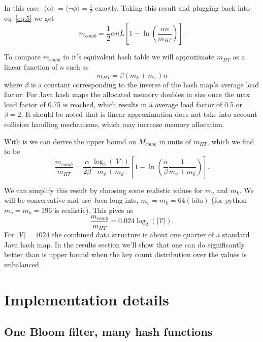 \documentclass[12pt]{article}
\DeclareMathOperator*{\ephi}{ \langle \phi \rangle}
\begin{document}
In this case $\ephi = \langle \lnot \phi \rangle = \frac{1}{2}$ exactly. Taking this result and plugging back into eq. \ref{eq:5} we get
\begin{equation} \label{eq:5}
m_{comb} = \frac{1}{2} \alpha n L \left[ 1 - \ln \left(\frac{\alpha n}{m_{HT}}\right) \right].
\end{equation} 

To compare $m_{comb}$ to it's equivalent hash table we will approximate $m_{HT}$ as a linear function of $n$ such as
\begin{equation}
m_{HT}= \beta (m_k + m_v)n 
\end{equation}
where $\beta$ is a constant corresponding to the inverse of the hash map's average load factor. For Java hash maps the allocated memory doubles in size once the max load factor of 0.75 is reached, which results in a average load factor of 0.5 or $\beta = 2$. It should be noted that is linear approximation does not take into account collision handling mechanisms, which may increase memory allocation. 

With is we can derive the upper bound on $M_{comb}$ in units of $m_{HT}$, which we find to be
\begin{equation}
\frac{m_{comb}}{m_{HT}}= \frac{\alpha}{2 \beta} \frac{\log_2(|\mathcal{V}|)}{m_v + m_k} \left[ 1 - \ln \left( \frac{\alpha}{ \beta}  \frac{1}{m_v + m_k} \right) \right].
\end{equation}

We can simplify this result by choosing some realistic values for $m_v$ and $m_k$. We will be conservative and use Java long ints, $m_v = m_k = 64 (\mathrm{bits})$ (for python $m_v = m_k = 196$ is realistic). This gives us
\begin{equation}
\frac{m_{comb}}{m_{HT}} = 0.024\log_2(|\mathcal{V}|).
\end{equation}
For $|\mathcal{V}| = 1024$ the combined data structure is about one quarter of a standard Java hash map. In the results section we'll show that one can do significantly better than is upper bound when the key count distribution over the values is unbalanced. 
 

\section*{Implementation details}

\subsection*{One Bloom filter, many hash functions}
\end{document}
